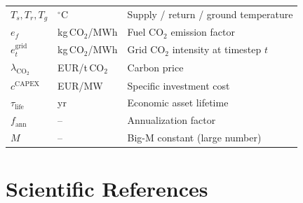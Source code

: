 \documentclass[a4paper,12pt]{article}
\begin{document}
\begin{table}[h!]
\begin{tabular}{@{}lll@{}}
    $T_s, T_r, T_g$                  & $^\circ$C      & Supply / return / ground temperature \\
    $e_f$                            & kg\,CO$_2$/MWh & Fuel CO$_2$ emission factor \\
    $e^{\text{grid}}_t$              & kg\,CO$_2$/MWh & Grid CO$_2$ intensity at timestep $t$ \\
    $\lambda_{\text{CO}_2}$          & EUR/t\,CO$_2$  & Carbon price \\
    $c^{\text{CAPEX}}$               & EUR/MW         & Specific investment cost \\
    $\tau_{\text{life}}$             & yr             & Economic asset lifetime \\
    $f_{\text{ann}}$                 & --             & Annualization factor \\
    $M$                              & --             & Big-M constant (large number) \\
    \bottomrule
  \end{tabular}
  \label{tab:notation}
\end{table}

\section*{Scientific References}
\end{document}
